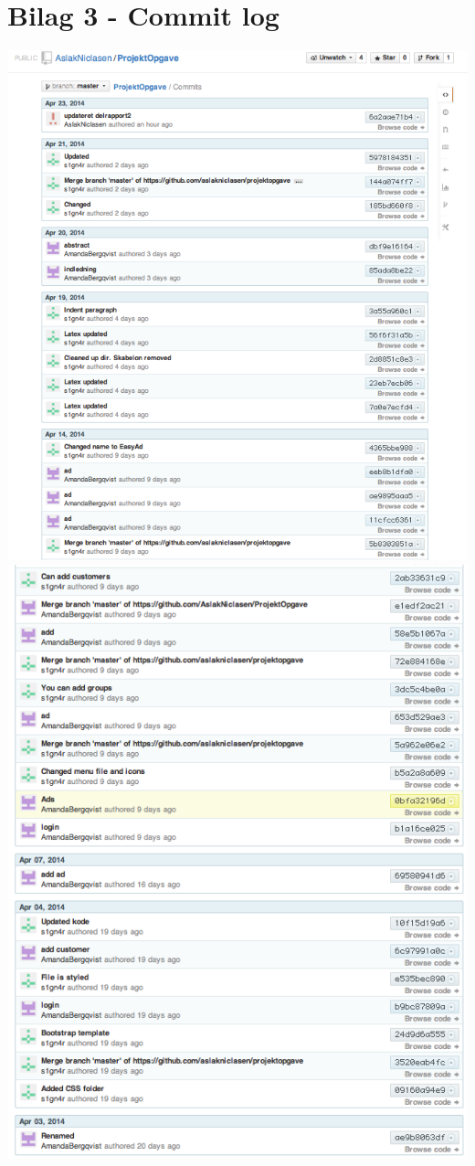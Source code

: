 \documentclass[a4paper,12pt]{article}
\begin{document}
\section{Bilag 3 - Commit log}
\includegraphics[width=\linewidth]{log1.png}
\newpage
\includegraphics[width=\linewidth]{log2.png}
\end{document}
